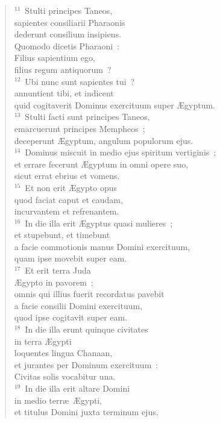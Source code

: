 \begin{flushleft}
\begin{verse}
${}^{11}$~Stulti principes Taneos,\\ sapientes consiliarii Pharaonis\\ dederunt consilium insipiens.\\ Quomodo dicetis Pharaoni~:\\ Filius sapientium ego,\\ filius regum antiquorum~?\\
${}^{12}$~Ubi nunc sunt sapientes tui~?\\ annuntient tibi, et indicent\\ quid cogitaverit Dominus exercituum super \AE gyptum.\\
${}^{13}$~Stulti facti sunt principes Taneos,\\ emarcuerunt principes Mempheos~;\\ deceperunt \AE gyptum, angulum populorum ejus.\\
${}^{14}$~Dominus miscuit in medio ejus spiritum vertiginis~;\\ et errare fecerunt \AE gyptum in omni opere suo,\\ sicut errat ebrius et vomens.\\
${}^{15}$~Et non erit \AE gypto opus\\ quod faciat caput et caudam,\\ incurvantem et refrenantem.\\
${}^{16}$~In die illa erit \AE gyptus quasi mulieres~;\\ et stupebunt, et timebunt\\ a facie commotionis manus Domini exercituum,\\ quam ipse movebit super eam.\\
${}^{17}$~Et erit terra Juda\\ \AE gypto in pavorem~;\\ omnis qui illius fuerit recordatus pavebit\\ a facie consilii Domini exercituum,\\ quod ipse cogitavit super eam.\\
${}^{18}$~In die illa erunt quinque civitates\\ in terra \AE gypti\\ loquentes lingua Chanaan,\\ et jurantes per Dominum exercituum~:\\ Civitas solis vocabitur una.\\
${}^{19}$~In die illa erit altare Domini\\ in medio terr\ae\ \AE gypti,\\ et titulus Domini juxta terminum ejus.\\

\end{verse}
\end{flushleft}
